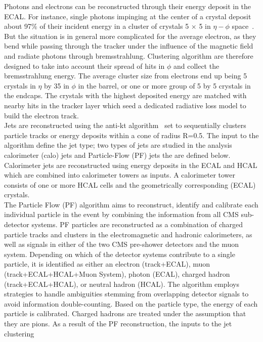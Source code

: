 \indent Photons and electrons can be reconstructed through their energy deposit in the ECAL. 
For instance, single photons impinging at the center of a crystal deposit about 97\% of their 
incident energy in a cluster of crystals 5 $\times$ 5 in $\eta-\phi$ space~\cite{Bayatian:922757}. 
But the situation is in general more complicated for the average electron, as they bend while 
passing through the tracker under the influence of the magnetic field and radiate photons through 
bremsstrahlung. Clustering algorithm are therefore designed to take into account their spread of 
hits in $\phi$ and collect the bremsstrahlung energy. The average cluster size from electrons end 
up being 5 crystals in $\eta$ by 35 in $\phi$ in the barrel, or one or more group of 5 by 5 
crystals in the endcaps. The crystals with the highest deposited energy are matched with nearby 
hits in the tracker layer which seed a dedicated radiative loss model to build the electron track.\\
\indent Jets are reconstructed using the anti-kt algorithm~\cite{antikt} set to sequentially clusters 
particle tracks or energy deposits within a cone of radius R=0.5. The input to the algorithm define
the jet type; two types of jets are studied in the analysis calorimeter (calo) jets and Particle-Flow 
(PF) jets the are defined below.\\
\indent Calorimeter jets are reconstructed using energy deposits in the ECAL and HCAL which are 
combined into calorimeter towers as inputs. A calorimeter tower consists of one or more HCAL cells 
and the geometrically corresponding (ECAL) crystals.\\
\indent The Particle Flow (PF) algorithm aims to reconstruct, identify and calibrate each individual 
particle in the event by combining the information from all CMS sub-detector systems. PF particles are 
reconstructed as a combination of charged particle tracks and clusters in the electromagnetic 
and hadronic calorimeters, as well as signals in either of the two CMS pre-shower detectors 
and the muon system. Depending on which of the detector systems contribute to a single particle, 
it is identified as either an electron (track+ECAL), muon (track+ECAL+HCAL+Muon System), photon (ECAL), 
charged hadron (track+ECAL+HCAL), or neutral hadron (HCAL). The algorithm employs strategies to handle 
ambiguities stemming from overlapping detector signals to avoid information double-counting. Based on 
the particle type, the energy of each particle is calibrated. Charged hadrons are treated under the 
assumption that they are pions. As a result of the PF reconstruction, the inputs to the jet clustering 
